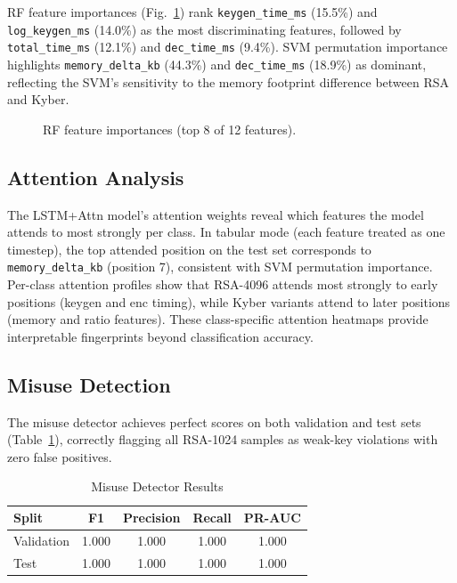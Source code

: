 \documentclass[conference]{IEEEtran}
\begin{document}
RF feature importances (Fig.~\ref{fig:importance}) rank
\texttt{keygen\_time\_ms} (15.5\%) and \texttt{log\_keygen\_ms} (14.0\%)
as the most discriminating features, followed by \texttt{total\_time\_ms}
(12.1\%) and \texttt{dec\_time\_ms} (9.4\%).
SVM permutation importance highlights \texttt{memory\_delta\_kb} (44.3\%)
and \texttt{dec\_time\_ms} (18.9\%) as dominant, reflecting the SVM's
sensitivity to the memory footprint difference between RSA and Kyber.

\begin{figure}[h]
\centering
\fbox{\rule{0pt}{3cm}\rule{0.9\columnwidth}{0pt}}
\caption{RF feature importances (top 8 of 12 features).}
\label{fig:importance}
\end{figure}

\subsection{Attention Analysis}

The LSTM+Attn model's attention weights reveal which features the model
attends to most strongly per class.
In tabular mode (each feature treated as one timestep), the top attended
position on the test set corresponds to \texttt{memory\_delta\_kb}
(position 7), consistent with SVM permutation importance.
Per-class attention profiles show that RSA-4096 attends most strongly
to early positions (keygen and enc timing), while Kyber variants attend
to later positions (memory and ratio features).
These class-specific attention heatmaps provide interpretable fingerprints
beyond classification accuracy.

\subsection{Misuse Detection}

The misuse detector achieves perfect scores on both validation and test
sets (Table~\ref{tab:misuse}), correctly flagging all RSA-1024 samples
as weak-key violations with zero false positives.

\begin{table}[h]
\caption{Misuse Detector Results}
\label{tab:misuse}
\centering
\begin{tabular}{lcccc}
\toprule
\textbf{Split} & \textbf{F1} & \textbf{Precision} & \textbf{Recall} & \textbf{PR-AUC} \\
\midrule
Validation & 1.000 & 1.000 & 1.000 & 1.000 \\
Test       & 1.000 & 1.000 & 1.000 & 1.000 \\
\bottomrule
\end{tabular}
\end{table}
\end{document}
